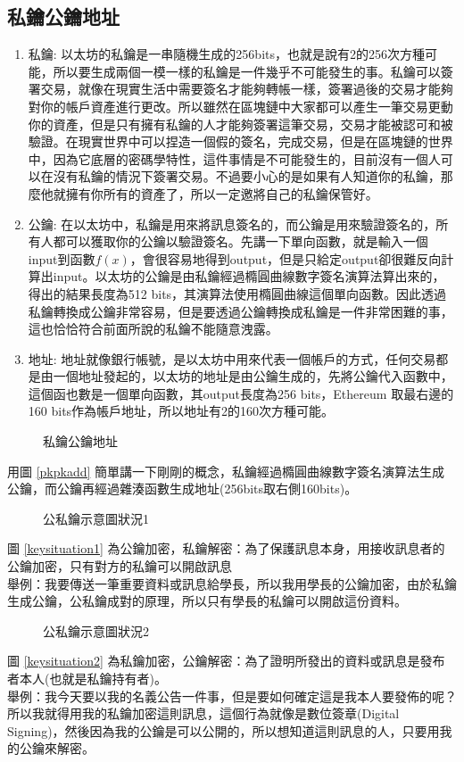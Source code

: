 \subsection{私鑰公鑰地址}
\begin{enumerate}
\item 私鑰:
以太坊的私鑰是一串隨機生成的256bits，也就是說有2的256次方種可能，所以要生成兩個一模一樣的私鑰是一件幾乎不可能發生的事。私鑰可以簽署交易，就像在現實生活中需要簽名才能夠轉帳一樣，簽署過後的交易才能夠對你的帳戶資產進行更改。所以雖然在區塊鏈中大家都可以產生一筆交易更動你的資產，但是只有擁有私鑰的人才能夠簽署這筆交易，交易才能被認可和被驗證。在現實世界中可以捏造一個假的簽名，完成交易，但是在區塊鏈的世界中，因為它底層的密碼學特性，這件事情是不可能發生的，目前沒有一個人可以在沒有私鑰的情況下簽署交易。不過要小心的是如果有人知道你的私鑰，那麼他就擁有你所有的資產了，所以一定邀將自己的私鑰保管好。
\item 公鑰:
在以太坊中，私鑰是用來將訊息簽名的，而公鑰是用來驗證簽名的，所有人都可以獲取你的公鑰以驗證簽名。先講一下單向函數，就是輸入一個input到函數$f(x)$，會很容易地得到output，但是只給定output卻很難反向計算出input。以太坊的公鑰是由私鑰經過橢圓曲線數字簽名演算法算出來的，得出的結果長度為512 bits，其演算法使用橢圓曲線這個單向函數。因此透過私鑰轉換成公鑰非常容易，但是要透過公鑰轉換成私鑰是一件非常困難的事，這也恰恰符合前面所說的私鑰不能隨意洩露。
\item 地址:
地址就像銀行帳號，是以太坊中用來代表一個帳戶的方式，任何交易都是由一個地址發起的，以太坊的地址是由公鑰生成的，先將公鑰代入函數中，這個函也數是一個單向函數，其output長度為256 bits，Ethereum 取最右邊的160 bits作為帳戶地址，所以地址有2的160次方種可能。 
\end{enumerate}
\begin{figure}[h]
    \caption{私鑰公鑰地址}
    \label{fig:pkpkadd}
\end{figure}
用圖 \ref{pkpkadd} 簡單講一下剛剛的概念，私鑰經過橢圓曲線數字簽名演算法生成公鑰，而公鑰再經過雜湊函數生成地址(256bits取右側160bits)。
\begin{figure}[H]
    \caption{公私鑰示意圖狀況1}
    \label{fig:keysituation1}
\end{figure}
圖 \ref{keysituation1} 為公鑰加密，私鑰解密：為了保護訊息本身，用接收訊息者的公鑰加密，只有對方的私鑰可以開啟訊息\\
舉例：我要傳送一筆重要資料或訊息給學長，所以我用學長的公鑰加密，由於私鑰生成公鑰，公私鑰成對的原理，所以只有學長的私鑰可以開啟這份資料。\\
\begin{figure}[H]
    \caption{公私鑰示意圖狀況2}
    \label{fig:keysituation2}
\end{figure}
圖 \ref{keysituation2} 為私鑰加密，公鑰解密：為了證明所發出的資料或訊息是發布者本人(也就是私鑰持有者)。\\
舉例：我今天要以我的名義公告一件事，但是要如何確定這是我本人要發佈的呢？所以我就得用我的私鑰加密這則訊息，這個行為就像是數位簽章(Digital Signing)，然後因為我的公鑰是可以公開的，所以想知道這則訊息的人，只要用我的公鑰來解密。\\
